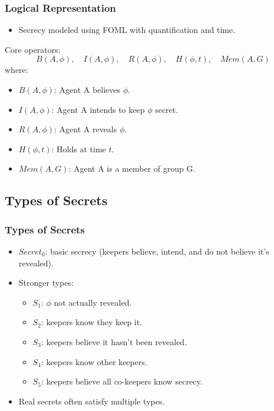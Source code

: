 \documentclass[aspectratio=169]{beamer}
\begin{document}
\begin{frame}
\frametitle{Logical Representation}
\begin{itemize}
    \item Secrecy modeled using FOML with quantification and time.
\end{itemize}
\begin{block}{Core operators:}
\[ 
B(A, \phi), \quad I(A, \phi), \quad R(A, \phi), \quad H(\phi, t), \quad Mem(A, G) 
\]
\normalsize where:
\begin{itemize}
    \item $B(A, \phi)$: Agent A believes $\phi$.
    \item $I(A, \phi)$: Agent A intends to keep $\phi$ secret.
    \item $R(A, \phi)$: Agent A reveals $\phi$.
    \item $H(\phi, t)$: Holds at time $t$.
    \item $Mem(A, G)$: Agent A is a member of group G.
\end{itemize}
\end{block}
\end{frame}

\subsection{Types of Secrets}
\begin{frame}
\frametitle{Types of Secrets}
\Large
\begin{itemize}
    \item $Secret_0$: basic secrecy (keepers believe, intend, and do not believe it's revealed).
    \item Stronger types:
    \begin{itemize}
        \Large
        \item $S_1$: $\phi$ not actually revealed.
        \item $S_2$: keepers know they keep it.
        \item $S_3$: keepers believe it hasn't been revealed.
        \item $S_4$: keepers know other keepers.
        \item $S_5$: keepers believe all co-keepers know secrecy.
    \end{itemize}
    \item Real secrets often satisfy multiple types.
\end{itemize}
\end{frame}
\end{document}
